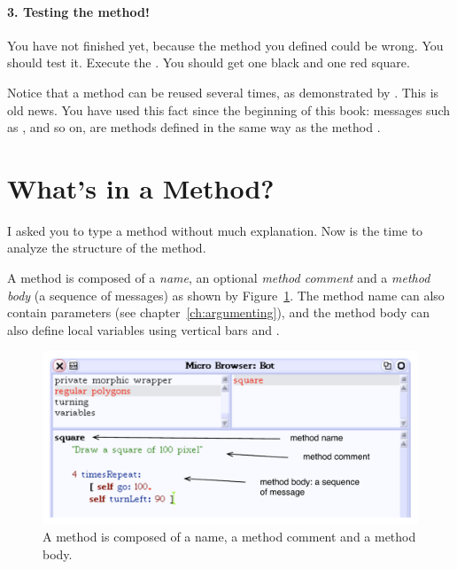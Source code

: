 

\paragraph{3. Testing the method!} You  have not finished yet, because 
the method you defined could be wrong. You should test it.  Execute the
. You should get one black and one red square.

Notice that a method can be reused several times, as demonstrated by .  This is old news. You have used this fact since the beginning of this book: messages such as \go, \turnLeft and so on, are methods defined in the same way as the method . 

\section{What's in a Method?}
I asked you to type a method without much explanation. Now is the time to
analyze the structure of the method. 

A method is composed of a \emph{name}, an optional \emph{method comment} and a \emph{method body} (a sequence of messages) as shown by Figure~\ref{fig:methodskeleton}. The method name can also contain parameters (see
chapter~\ref{ch:argumenting}), and the method body can also
define local variables using vertical bars \ct{|} and \ct{|}.

\begin{figure}[h]
\centerline{\includegraphics[width=15cm]{tbSixAnnotated}} 
\caption{A method is composed of a name, a method comment and a 
method body. \label{fig:methodskeleton}}
\end{figure}

